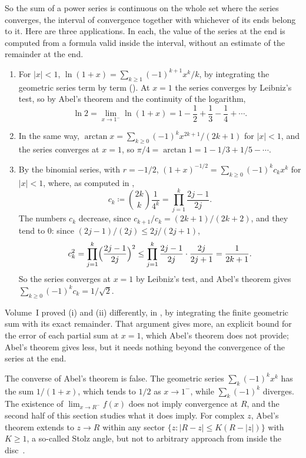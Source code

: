 So the sum of a power series is continuous on the whole set where the series converges, the interval of convergence together with whichever of its ends belong to it. Here are three applications. In each, the value of the series at the end is computed from a formula valid inside the interval, without an estimate of the remainder at the end.
\begin{enumerate}
\item For $|x|<1$, $\ln(1+x)=\sum_{k\ge1}(-1)^{k+1}x^k/k$, by integrating the geometric series term by term (). At $x=1$ the series converges by Leibniz's test, so by Abel's theorem and the continuity of the logarithm,
\[
\ln2=\lim_{x\to1^-}\ln(1+x)=1-\frac12+\frac13-\frac14+\cdots .
\]
\item In the same way, $\arctan x=\sum_{k\ge0}(-1)^kx^{2k+1}/(2k+1)$ for $|x|<1$, and the series converges at $x=1$, so $\pi/4=\arctan1=1-1/3+1/5-\cdots$.
\item By the binomial series,  with $r=-1/2$, $(1+x)^{-1/2}=\sum_{k\ge0}(-1)^kc_kx^k$ for $|x|<1$, where, as computed in ,
\[
c_k\coloneqq\binom{2k}k\frac1{4^k}=\prod_{j=1}^k\frac{2j-1}{2j} .
\]
The numbers $c_k$ decrease, since $c_{k+1}/c_k=(2k+1)/(2k+2)$, and they tend to $0$: since $(2j-1)/(2j)\le2j/(2j+1)$,
\[
c_k^2=\prod_{j=1}^k\Bigl(\frac{2j-1}{2j}\Bigr)^2\le\prod_{j=1}^k\frac{2j-1}{2j}\cdot\frac{2j}{2j+1}=\frac1{2k+1} .
\]
So the series converges at $x=1$ by Leibniz's test, and Abel's theorem gives $\sum_{k\ge0}(-1)^kc_k=1/\sqrt2$.
\end{enumerate}
Volume~I proved (i) and (ii) differently, in , by integrating the finite geometric sum with its exact remainder. That argument gives more, an explicit bound for the error of each partial sum at $x=1$, which Abel's theorem does not provide; Abel's theorem gives less, but it needs nothing beyond the convergence of the series at the end.

The converse of Abel's theorem is false. The geometric series $\sum_k(-1)^kx^k$ has the sum $1/(1+x)$, which tends to $1/2$ as $x\to1^-$, while $\sum_k(-1)^k$ diverges. The existence of $\lim_{x\to R^-}f(x)$ does not imply convergence at $R$, and the second half of this section studies what it does imply. For complex $z$, Abel's theorem extends to $z\to R$ within any sector $\{z: |R-z|\le K(R-|z|)\}$ with $K\ge1$, a so-called Stolz angle, but not to arbitrary approach from inside the disc~\cite{knopp1990}.

